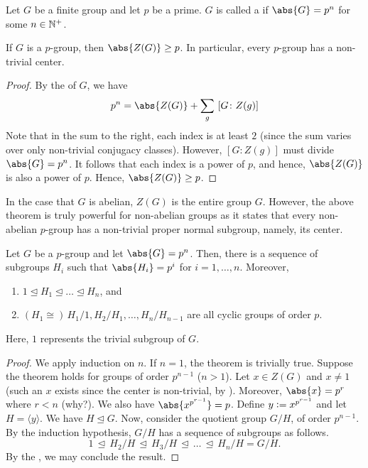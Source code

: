 \begin{defn}
    Let $G$ be a finite group and let $p$ be a prime. $G$ is called a  if $\abs{G} = p^n$ for some $n \in \mathbb{N}^+$.
\end{defn}

\begin{theorem} \label{thm:p-group-has-non-trivial-center}
    If $G$ is a $p$-group, then $\abs{Z(G)} \geq p$. In particular, every $p$-group has a non-trivial center. 
\end{theorem}
\begin{proof}
    By the  of $G$, we have
    \[
        p^n = \abs{Z(G)} + \sum_{g} \, \left[ G \colon Z(g) \right]
    \]
    Note that in the sum to the right, each index is at least $2$ (since the sum varies over only non-trivial conjugacy classes). However, $\left[ G \colon Z(g) \right]$ must divide $\abs{G} = p^n$. It follows that each index is a power of $p$, and hence, $\abs{Z(G)}$ is also a power of $p$. Hence, $\abs{Z(G)} \geq p$. 
\end{proof}
In the case that $G$ is abelian, $Z(G)$ is the entire group $G$. However, the above theorem is truly powerful for non-abelian groups as it states that every non-abelian $p$-group has a non-trivial proper normal subgroup, namely, its center. 

\begin{theorem}
    Let $G$ be a $p$-group and let $\abs{G} = p^n$. Then, there is a sequence of subgroups $H_i$ such that $\abs{H_i} = p^i$ for $i = 1, \ldots, n$. Moreover,
    \begin{enumerate}
        \item $1 \trianglelefteq H_1 \trianglelefteq \ldots \trianglelefteq H_n$, and 
        \item $(H_1 \cong) \, H_1 / 1 , H_2/H_1, \ldots, H_n/H_{n-1}$ are all cyclic groups of order $p$.
    \end{enumerate}
    Here, $1$ represents the trivial subgroup of $G$.
\end{theorem}
\begin{proof}
    We apply induction on $n$. If $n = 1$, the theorem is trivially true. Suppose the theorem holds for groups of order $p^{n-1}$ ($n > 1$). Let $x \in Z(G)$ and $x \neq 1$ (such an $x$ exists since the center is non-trivial, by ). Moreover, $\abs{x} = p^r$ where $r < n$ (why?). We also have $\abs{x^{p^{r-1}}} = p$. Define $y \vcentcolon= x^{p^{r-1}}$ and let $H = \langle y \rangle$. We have $H \trianglelefteq G$. Now, consider the quotient group $G/H$, of order $p^{n-1}$. By the induction hypothesis, $G/H$ has a sequence of subgroups as follows.
    \[
        1 \, \trianglelefteq \, H_2/H \, \trianglelefteq \, H_3/H \, \trianglelefteq \, \ldots \, \trianglelefteq \, H_n/H = G/H.
    \]
    By the , we may conclude the result.
\end{proof} 

